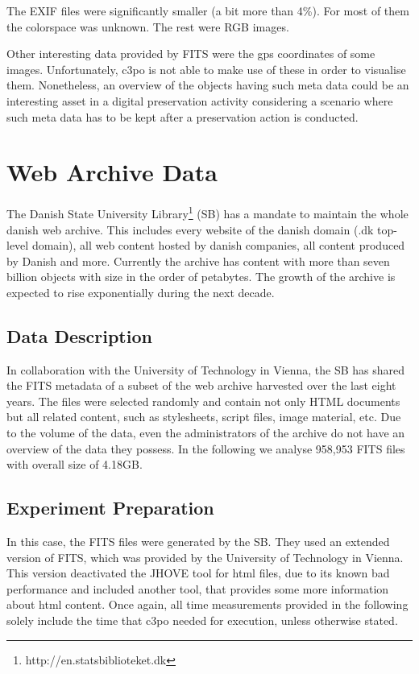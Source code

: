 The EXIF files were significantly smaller (a bit more than 4\%).
For most of them the colorspace was unknown.
The rest were RGB images.

Other interesting data provided by FITS were the gps coordinates of some images.
Unfortunately, c3po is not able to make use of these in order to visualise them.
Nonetheless, an overview of the objects having such meta data could be an interesting asset in a digital preservation activity considering a scenario where such meta data has to be kept after a preservation action is conducted. 

\section{Web Archive Data}
The Danish State University Library\footnote{http://en.statsbiblioteket.dk} (SB) has a mandate to maintain the whole danish web archive.
This includes every website of the danish domain (.dk top-level domain), all web content hosted by danish companies, all content produced by Danish and more.
Currently the archive has content with more than seven billion objects with size in the order of petabytes. The growth of the archive is expected to rise exponentially during the next decade.

\subsection{Data Description}
In collaboration with the University of Technology in Vienna, the SB has shared the FITS metadata of a subset of the web archive harvested over the last eight years.
The files were selected randomly and contain not only HTML documents but all related content, such as stylesheets, script files, image material, etc.
Due to the volume of the data, even the administrators of the archive do not have an overview of the data they possess.
In the following we analyse 958,953 FITS files with overall size of 4.18GB.

\subsection{Experiment Preparation}
In this case, the FITS files were generated by the SB. They used an extended version of FITS, which was provided by the University of Technology in Vienna.
This version deactivated the JHOVE tool for html files, due to its known bad performance and  included another tool, that provides some more information about html content.
Once again, all time measurements provided in the following solely include the time that c3po needed for execution, unless otherwise stated.

